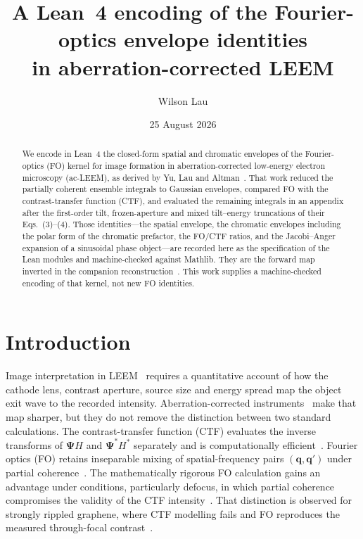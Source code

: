 \documentclass[11pt,a4paper]{article}
\title{A Lean~4 encoding of the Fourier-optics envelope identities\\
in aberration-corrected LEEM}
\author{Wilson Lau}
\date{25 August 2026}
\theoremstyle{definition}
\theoremstyle{remark}
\begin{document}
\maketitle

\begin{abstract}
We encode in Lean~4 the closed-form spatial and chromatic envelopes of
the Fourier-optics (FO) kernel for image formation in
aberration-corrected low-energy electron microscopy (ac-LEEM), as
derived by Yu, Lau and Altman~\cite{Yu2019}.
That work reduced the partially coherent ensemble integrals to
Gaussian envelopes, compared FO with the contrast-transfer function
(CTF), and evaluated the remaining integrals in an appendix after the
first-order tilt, frozen-aperture and mixed tilt--energy truncations
of their Eqs.~(3)--(4).
Those identities---the spatial envelope, the chromatic envelopes
including the polar form of the chromatic prefactor, the FO/CTF
ratios, and the Jacobi--Anger expansion of a sinusoidal phase
object---are recorded here as the specification of the Lean modules
and machine-checked against Mathlib.
They are the forward map inverted in the companion
reconstruction~\cite{Lau2026inverse}.
This work supplies a machine-checked encoding of that kernel, not new
FO identities.
\end{abstract}

\section{Introduction}
\label{sec:intro}

Image interpretation in LEEM~\cite{Bauer1994,Bauer2014,Tromp2000,Altman2010}
requires a quantitative account of how the cathode lens, contrast
aperture, source size and energy spread map the object exit wave to
the recorded intensity.
Aberration-corrected instruments~\cite{Tromp2010,Tromp2013} make that
map sharper, but they do not remove the distinction between two
standard calculations.
The contrast-transfer function (CTF) evaluates the inverse transforms
of $\boldsymbol{\Psi}H$ and $\boldsymbol{\Psi}^*H^*$ separately and is computationally
efficient~\cite{Schramm2012,Tromp2012}.
Fourier optics (FO) retains inseparable mixing of spatial-frequency
pairs $(\mathbf{q},\mathbf{q}')$ under partial
coherence~\cite{Pang2009,Yu2017,Yu2019}.
The mathematically rigorous FO calculation gains an advantage under
conditions, particularly defocus, in which partial coherence
compromises the validity of the CTF intensity~\cite{Yu2019}.
That distinction is observed for strongly rippled graphene, where CTF
modelling fails and FO reproduces the measured through-focal
contrast~\cite{Yu2017}.
\end{document}
